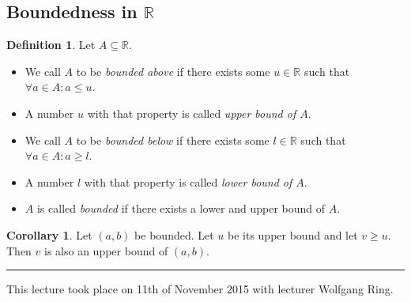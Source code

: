 \documentclass[a4paper,landscape,twocolumn]{article}
\theoremstyle{definition}
\newtheorem{defi}{Definition}
\newtheorem{cor}{Corollary}
\newcommand\meta[3]{\hrule{} This #1 took place on #2 with lecturer #3.\par}
\begin{document}
\subsection{Boundedness in $\mathbb R$}
\begin{defi}
  Let $A \subseteq \mathbb R$.
  \begin{itemize}
    \item We call $A$ to be \emph{bounded above} if there exists some $u \in \mathbb R$ such that $\forall a \in A: a \leq u$.
    \item A number $u$ with that property is called \emph{upper bound of $A$}.
    \item We call $A$ to be \emph{bounded below} if there exists some $l \in \mathbb R$ such that $\forall a \in A: a \geq l$.
    \item A number $l$ with that property is called \emph{lower bound of $A$}.
    \item $A$ is called \emph{bounded} if there exists a lower and upper bound of $A$.
  \end{itemize}
\end{defi}

\begin{cor}
  Let $(a, b)$ be bounded.
  Let $u$ be its upper bound and let $v \geq u$.
  Then $v$ is also an upper bound of $(a, b)$.
\end{cor}

\meta{lecture}{11th of November 2015}{Wolfgang Ring}
\end{document}
